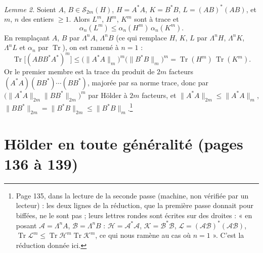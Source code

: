 \documentclass[11pt,a4paper]{article}
\begin{document}
\emph{Lemme 2.} Soient $A$, $B \in \mathcal{S}_{2m}(H)$, $H = A^{*}A$, $K =
B^{*}B$, $L = (AB)^{*}(AB)$, et $m$, $n$ des entiers $\geq 1$. Alors $L^m$,
$H^m$, $K^m$ sont à trace et
\[
  \alpha_n(L^m) \leq \alpha_n(H^m)\,\alpha_n(K^m) .
\]
En remplaçant $A$, $B$ par $\Lambda^n A$, $\Lambda^n B$ (ce qui remplace
$H$, $K$, $L$ par $\Lambda^n H$, $\Lambda^n K$, $\Lambda^n L$ et $\alpha_n$
par $\operatorname{Tr}$), on est ramené à $n = 1$ :
\[
  \operatorname{Tr}\bigl[(ABB^{*}A^{*})^m\bigr] \leq
  \bigl(\|A^{*}A\|_m\bigr)^m\bigl(\|B^{*}B\|_m\bigr)^m
  = \operatorname{Tr}(H^m)\,\operatorname{Tr}(K^m) .
\]
Or le premier membre est la trace du produit de $2m$ facteurs $(A^{*}A)(BB^{*})
\cdots(BB^{*})$, majorée par sa norme trace, donc par $\bigl(\|A^{*}A\|_{2m}
\|BB^{*}\|_{2m}\bigr)^m$ par Hölder à $2m$ facteurs, et $\|A^{*}A\|_{2m} \leq
\|A^{*}A\|_m$, $\|BB^{*}\|_{2m} = \|B^{*}B\|_{2m} \leq \|B^{*}B\|_m$.\footnote{Page
135, dans la lecture de la seconde passe (machine, non vérifiée par un
lecteur) : les deux lignes de la réduction, que la première passe donnait
pour biffées, ne le sont pas ; leurs lettres rondes sont écrites sur des
droites : « en posant $\mathcal{A} = \Lambda^n A$, $\mathcal{B} = \Lambda^n
B$ : $\mathcal{H} = \mathcal{A}^{*}\mathcal{A}$, $\mathcal{K} =
\mathcal{B}^{*}\mathcal{B}$, $\mathcal{L} = (\mathcal{A}\mathcal{B})^{*}
(\mathcal{A}\mathcal{B})$, $\operatorname{Tr}\mathcal{L}^m \leq
\operatorname{Tr}\mathcal{H}^m \operatorname{Tr}\mathcal{K}^m$, ce qui nous
ramène au cas où $n = 1$ ». C'est la réduction donnée ici.}

\section*{Hölder en toute généralité (pages 136 à 139)}
\end{document}
